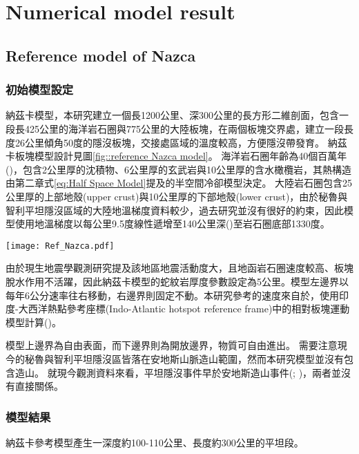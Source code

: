 
\chapter{Numerical model result}

\section{Reference model of Nazca}
\subsection{初始模型設定}
納茲卡模型，本研究建立一個長1200公里、深300公里的長方形二維剖面，包含一段長425公里的海洋岩石圈與775公里的大陸板塊，在兩個板塊交界處，建立一段長度26公里傾角50度的隱沒板塊，交接處區域的溫度較高，方便隱沒帶發育。
納茲卡板塊模型設計見圖\ref{fig::reference Nazca model}。
海洋岩石圈年齡為40個百萬年(\citealp{muller2019})，包含2公里厚的沈積物、6公里厚的玄武岩與10公里厚的含水橄欖岩，其熱構造由第二章式\ref{eq:Half Space Model}提及的半空間冷卻模型決定。
大陸岩石圈包含25公里厚的上部地殼(upper crust)與10公里厚的下部地殼(lower crust)，由於秘魯與智利平坦隱沒區域的大陸地溫梯度資料較少，過去研究並沒有很好的約束，因此模型使用地溫梯度以每公里9.5度線性遞增至140公里深(\citealp{perez2008})至岩石圈底部1330度。

\begin{figure*}[hb]
    \centering
    \texttt{[image: Ref\_Nazca.pdf]}
    \caption[納茲卡板塊隱沒模型設計與邊界條件示意圖]{納茲卡板塊隱沒模型設計與邊界條件示意圖}
    \label{fig::reference Nazca model}
\end{figure*}


由於現生地震學觀測研究提及該地區地震活動度大，且地函岩石圈速度較高、板塊脫水作用不活躍，因此納茲卡模型的蛇紋岩厚度參數設定為5公里。模型左邊界以每年6公分速率往右移動，右邊界則固定不動。本研究參考的速度來自於\citealp{o2005uncertainties}，使用印度-大西洋熱點參考座標(Indo-Atlantic hotspot reference frame)中的相對板塊運動模型計算(\citealp{schellart2008global})。

模型上邊界為自由表面，而下邊界則為開放邊界，物質可自由進出。
需要注意現今的秘魯與智利平坦隱沒區皆落在安地斯山脈造山範圍，然而本研究模型並沒有包含造山。
就現今觀測資料來看，平坦隱沒事件早於安地斯造山事件(\citealp{chen2019southward}; \citealp{hu2021southward})，兩者並沒有直接關係。


\subsection{模型結果}
納茲卡參考模型產生一深度約100-110公里、長度約300公里的平坦段。

